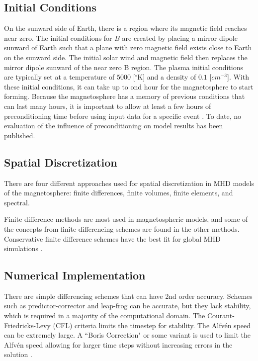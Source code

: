 \subsection{Initial Conditions}
\label{InitialConditions}
On the sunward side of Earth, there is a region where its magnetic field
reaches near zero. The initial conditions for $B$ are created by placing a
mirror dipole sunward of Earth such that a plane with zero magnetic field exists
close to Earth on the sunward side.
The initial solar wind and magnetic field then replaces the mirror dipole
sunward of the near zero B region.
The plasma initial conditions are typically set at a temperature of
$5000$ [$^\circ$K] and a density of $0.1$ [$cm^{-3}$]. With these initial
conditions, it can take up to ond hour for the magnetosphere to start forming. Because
the magnetosphere has a memory of previous conditions that can last
many hours, it is important to allow at least a few hours of preconditioning
time before using input data for a specific event \citep{Raeder2003}. To date,
no evaluation of the influence of preconditioning on model results has been
published.

\subsection{Spatial Discretization}
There are four different approaches used for spatial discretization in MHD
models of the magnetosphere: finite differences, finite volumes, finite
elements, and spectral.

Finite difference methods are most used in magnetospheric models, and some of
the concepts from finite differencing schemes are found in the other methods.
Conservative finite difference schemes have the best fit for global MHD
simulations \citep{Raeder2003}.

\subsection{Numerical Implementation}
There are simple differencing schemes that can have 2nd order accuracy.
Schemes such as predictor-corrector and leap-frog can be accurate,
but they lack stability, which is required in a majority of the computational
domain. The Courant-Friedricks-Levy (CFL) criteria limits the timestep for
stability. The Alfv\'en speed can be extremely large. A ``Boris Correction" or
some variant is used to limit the Alfv\'en speed allowing for larger time steps
without increasing errors in the solution \citep{Raeder2003}.

